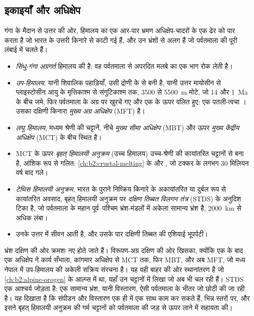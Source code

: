 \subsection{इकाइयाँ और अधिक्षेप}

गंगा के मैदान से उत्तर की ओर, हिमालय का एक आर-पार भ्रमण अधिक्षेप-चादरों के एक ढेर को पार करता है
जो भारत के उत्तरी किनारे से काटी गई हैं, और उन भ्रंशों से अलग हैं जो पर्वतमाला की पूरी लंबाई में चलते हैं।
\begin{itemize}
\item \emph{सिंधु-गंगा अग्रगर्त} हिमालय की  है; वह पर्वतमाला से अपरदित
मलबे का एक भाग रोक लेती है।
\item \emph{उप-हिमालय}, यानी शिवालिक पहाड़ियाँ, उसी द्रोणी के  से बनी है,
यानी उत्तर मायोसीन से प्लाइस्टोसीन आयु के मृत्तिकाश्म से संगुटिकाश्म तक, 3500 से \qty{5500}{m} मोटे,
जो 14 और \qty{1}{Ma} के बीच जमे, फिर पर्वतमाला के अग्र पर खुरचे गए और एक
 के ऊपर वलित हुए: एक पतली-त्वचा । उसका दक्षिणी किनारा \emph{मुख्य अग्र
अधिक्षेप} (MFT) है।
\item \emph{लघु हिमालय}, मध्यम  श्रेणी की चट्टानें, नीचे
\emph{मुख्य सीमा अधिक्षेप} (MBT) और ऊपर \emph{मुख्य केंद्रीय अधिक्षेप} (MCT) के बीच स्थित है।
\item MCT के ऊपर \emph{बृहत् हिमालयी अनुक्रम} (उच्च हिमालय)
उच्च-श्रेणी की कायांतरित चट्टानों से बना है, आंशिक रूप से गलित: \cref{ch:b2:crustal-melting} के
 और , जो टक्कर के लगभग 30 मिलियन वर्ष बाद गले।
\item \emph{टेथिस हिमालयी अनुक्रम}, भारत के पुराने निष्क्रिय किनारे के अकायांतरित या दुर्बल रूप से कायांतरित
अवसाद, बृहत् हिमालयी अनुक्रम पर
\emph{दक्षिण तिब्बत विलगन तंत्र} (STDS) के अनुदिश टिका है, जो पर्वतमाला के महान पूर्व--पश्चिम भ्रंश-मंडलों में
अकेला सामान्य भ्रंश है, \qty{2000}{km} से अधिक लंबा।
\item उनके उत्तर में सीवन आती है, और उसके पार दक्षिणी तिब्बत की एशियाई भूपर्पटी।
\end{itemize}

भ्रंश दक्षिण की ओर क्रमशः नए होते जाते हैं। विरूपण-अग्र दक्षिण की ओर खिसका, क्योंकि एक के बाद एक अधिक्षेप ने
कार्य सँभाला, कांगमार अधिक्षेप से MCT तक, फिर MBT, और अब MFT, जो मध्य
नेपाल में उप-हिमालय की अकेली सक्रिय संरचना है। यह वही बाहर की ओर
स्थानांतरण है जो \cref{ch:b2:alpine-orogen} के आल्प्स में था, यहाँ उन चट्टानों में लिखा जो अब भी
चल रही हैं। STDS एक आश्चर्य जोड़ता है: एक सामान्य भ्रंश, यानी विस्तारण, ऐसी पर्वतमाला के भीतर जो
छोटी की जा रही है। यह दिखाता है कि संपीडन और विस्तारण एक ही  में एक साथ काम कर सकते हैं,
भिन्न स्तरों पर, और इसने बृहत् हिमालयी अनुक्रम की गर्म चट्टानों को पर्वतमाला की जड़ से
ऊपर लाने में सहायता की।

